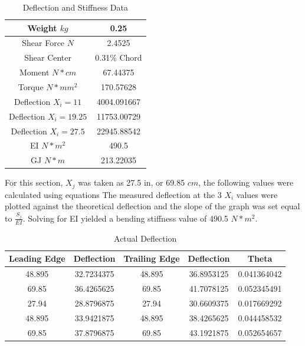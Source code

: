 \documentclass{article}
\begin{document}
\begin{table}[hbtp]
  \centering
  \begin{tabular}{|c|c|}
  \hline
  Weight \(kg\) & 0.25 \\
  \hline
  Shear Force \(N\) & 2.4525 \\
  \hline
  Shear Center & 0.31\% Chord \\
  \hline
  Moment \(N*cm\) & 67.44375 \\
  \hline
  Torque \(N*mm^2\) & 170.57628 \\
  \hline
  Deflection \(X_i=11\) & 4004.091667 \\
  \hline
  Deflection \(X_i=19.25\) & 11753.00729 \\
  \hline
  Deflection \(X_i=27.5\) & 22945.88542 \\
  \hline
  EI \(N*m^2\) & 490.5 \\
  \hline
  GJ \(N*m\) & 213.22035 \\
  \hline
  \end{tabular}
  \caption{Deflection and Stiffness Data}
  \label{tab:deflect_stiff}
\end{table}

For this section, \(X_j\) was taken as 27.5 in, or 69.85 \(cm\), the following values were calculated using equations %
  The measured deflection at the 3 \(X_i\) values were plotted against the theoretical deflection and the slope of the graph was set equal to \(\frac{S_j}{EI}\).  Solving for EI yielded a bending stiffness value of 490.5 \(N*m^2\).

\begin{table}[hbtp]
  \centering
  \begin{tabular}{ccccc}
  \hline
  Leading Edge & Deflection & Trailing Edge & Deflection & Theta \\
  \hline
  48.895 & 32.7234375 & 48.895 & 36.8953125 & 0.041364042 \\
  69.85 & 36.4265625 & 69.85 & 41.7078125 & 0.052345491 \\
  27.94 & 28.8796875 & 27.94 & 30.6609375 & 0.017669292 \\
  48.895 & 33.9421875 & 48.895 & 38.4265625 & 0.044458532 \\
  69.85 & 37.8796875 & 69.85 & 43.1921875 & 0.052654657 \\
  \hline
  \end{tabular}
  \caption{Actual Deflection}
  \label{table:actual_deflection}
  \end{table}
  
\end{document}
